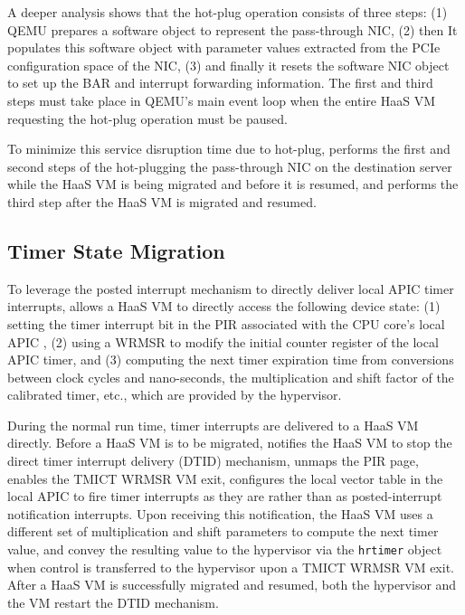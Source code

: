 A deeper analysis shows that the hot-plug operation consists of three steps:
(1) QEMU prepares a software object to represent the pass-through
NIC, (2) then It populates this software object with parameter values extracted
from the PCIe configuration space of the NIC, (3) and finally it
resets the software NIC object to set up the BAR and interrupt forwarding
information. The first and third steps must take place in QEMU's main event
loop when the entire HaaS VM requesting the hot-plug operation must be paused.

To minimize this service disruption time due to hot-plug,
\na performs the first and second steps of the hot-plugging the pass-through NIC
on the destination server while the HaaS VM is being migrated and before it is resumed,
and performs the third step after the HaaS VM is migrated and resumed.


\vspace{-0.1in}
\subsection{Timer State Migration}
\vspace{-0.05in}

To leverage the posted interrupt mechanism to directly deliver local APIC timer interrupts,
\na allows a HaaS VM to directly access the following device state:
(1) setting the timer interrupt bit in the PIR associated with the CPU core's local APIC ,  (2)
using a WRMSR to modify the initial counter register of the local APIC timer, and (3)
computing the next timer expiration time from conversions between clock cycles and nano-seconds, the multiplication
and shift factor of the calibrated timer, etc., which are provided by the hypervisor.

During the normal run time, timer interrupts are delivered to a HaaS VM directly.
Before a HaaS VM is to be migrated, \na notifies the HaaS VM to stop the
direct timer interrupt delivery (DTID) mechanism, unmaps the PIR page,
enables the TMICT WRMSR VM exit, configures the local vector table in the local APIC to
fire timer interrupts as they are rather than as posted-interrupt notification interrupts.
Upon receiving this notification, the HaaS VM uses a different set of
multiplication and shift parameters to compute the next timer value,
and convey the resulting value to the hypervisor via the \texttt{hrtimer} object
when control is transferred to the hypervisor upon a TMICT WRMSR VM exit.
After a HaaS VM is successfully migrated and resumed, both the hypervisor and the VM restart
the DTID mechanism. 



